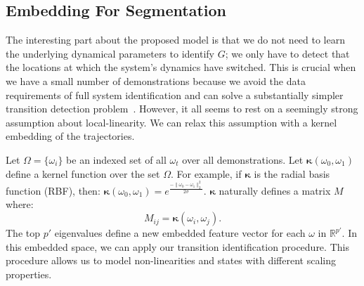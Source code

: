 \subsection{Embedding For Segmentation}\label{sec:kern}
The interesting part about the proposed model is that we do not need to learn the underlying dynamical parameters to identify $G$; we only have to detect that the locations at which the system's dynamics have switched.
This is crucial when we have a small number of demonstrations because we avoid the data requirements of full system identification and can solve a substantially simpler transition detection problem~\cite{willsky2009sharing,niekum2012learning, krishnan2015tsc,murali2016}.
However, it all seems to rest on a seemingly strong assumption about local-linearity.
We can relax this assumption with a kernel embedding of the trajectories.

Let $\Omega = \{\omega_i\}$ be an indexed set of all $\omega_t$ over all demonstrations.
Let $\mathbf{\kappa}(\omega_0,\omega_1)$ define a kernel function over the set $\Omega$.
For example, if $\mathbf{\kappa}$ is the radial basis function (RBF), then:
$ \mathbf{\kappa}(\omega_0,\omega_1) = e^{\frac{-\|\omega_0-\omega_1\|_2^2}{2\sigma}}$.
$\mathbf{\kappa}$ naturally defines a matrix $M$ where:
\[
M_{ij} = \mathbf{\kappa}(\omega_i,\omega_j). 
\]
The top $p'$ eigenvalues define a new embedded feature vector for each $\omega$ in $\mathbb{R}^{p'}$.
In this embedded space, we can apply our transition identification procedure.
This procedure allows us to model non-linearities and states with different scaling properties.

